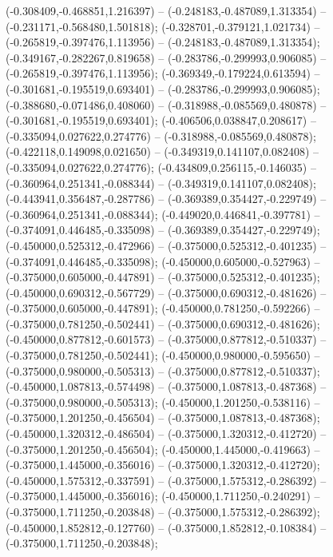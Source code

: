  (-0.308409,-0.468851,1.216397) -- (-0.248183,-0.487089,1.313354) -- (-0.231171,-0.568480,1.501818);
 (-0.328701,-0.379121,1.021734) -- (-0.265819,-0.397476,1.113956) -- (-0.248183,-0.487089,1.313354);
 (-0.349167,-0.282267,0.819658) -- (-0.283786,-0.299993,0.906085) -- (-0.265819,-0.397476,1.113956);
 (-0.369349,-0.179224,0.613594) -- (-0.301681,-0.195519,0.693401) -- (-0.283786,-0.299993,0.906085);
 (-0.388680,-0.071486,0.408060) -- (-0.318988,-0.085569,0.480878) -- (-0.301681,-0.195519,0.693401);
 (-0.406506,0.038847,0.208617) -- (-0.335094,0.027622,0.274776) -- (-0.318988,-0.085569,0.480878);
 (-0.422118,0.149098,0.021650) -- (-0.349319,0.141107,0.082408) -- (-0.335094,0.027622,0.274776);
 (-0.434809,0.256115,-0.146035) -- (-0.360964,0.251341,-0.088344) -- (-0.349319,0.141107,0.082408);
 (-0.443941,0.356487,-0.287786) -- (-0.369389,0.354427,-0.229749) -- (-0.360964,0.251341,-0.088344);
 (-0.449020,0.446841,-0.397781) -- (-0.374091,0.446485,-0.335098) -- (-0.369389,0.354427,-0.229749);
 (-0.450000,0.525312,-0.472966) -- (-0.375000,0.525312,-0.401235) -- (-0.374091,0.446485,-0.335098);
 (-0.450000,0.605000,-0.527963) -- (-0.375000,0.605000,-0.447891) -- (-0.375000,0.525312,-0.401235);
 (-0.450000,0.690312,-0.567729) -- (-0.375000,0.690312,-0.481626) -- (-0.375000,0.605000,-0.447891);
 (-0.450000,0.781250,-0.592266) -- (-0.375000,0.781250,-0.502441) -- (-0.375000,0.690312,-0.481626);
 (-0.450000,0.877812,-0.601573) -- (-0.375000,0.877812,-0.510337) -- (-0.375000,0.781250,-0.502441);
 (-0.450000,0.980000,-0.595650) -- (-0.375000,0.980000,-0.505313) -- (-0.375000,0.877812,-0.510337);
 (-0.450000,1.087813,-0.574498) -- (-0.375000,1.087813,-0.487368) -- (-0.375000,0.980000,-0.505313);
 (-0.450000,1.201250,-0.538116) -- (-0.375000,1.201250,-0.456504) -- (-0.375000,1.087813,-0.487368);
 (-0.450000,1.320312,-0.486504) -- (-0.375000,1.320312,-0.412720) -- (-0.375000,1.201250,-0.456504);
 (-0.450000,1.445000,-0.419663) -- (-0.375000,1.445000,-0.356016) -- (-0.375000,1.320312,-0.412720);
 (-0.450000,1.575312,-0.337591) -- (-0.375000,1.575312,-0.286392) -- (-0.375000,1.445000,-0.356016);
 (-0.450000,1.711250,-0.240291) -- (-0.375000,1.711250,-0.203848) -- (-0.375000,1.575312,-0.286392);
 (-0.450000,1.852812,-0.127760) -- (-0.375000,1.852812,-0.108384) -- (-0.375000,1.711250,-0.203848);
